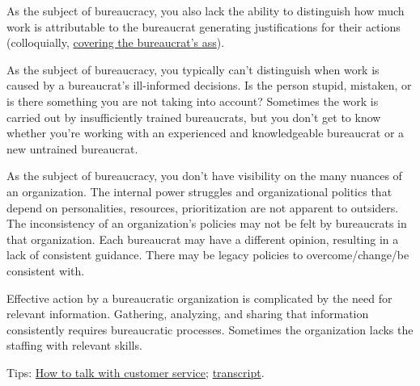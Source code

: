 As the subject of bureaucracy, you also lack the ability to distinguish how much work is attributable to the bureaucrat generating justifications for their actions (colloquially, \href{https://en.wikipedia.org/wiki/Cover_your_ass}{covering the bureaucrat's ass}). 

As the subject of bureaucracy, you typically can't distinguish when work is caused by a bureaucrat's ill-informed decisions. Is the person stupid, mistaken, or is there something you are not taking into account?
Sometimes the work is carried out by insufficiently trained bureaucrats, but you don't get to know whether you're working with an experienced and knowledgeable bureaucrat or a new untrained bureaucrat. 

As the subject of bureaucracy, you don't have visibility on the many nuances of an organization. The internal power struggles and organizational politics that depend on personalities, resources, prioritization are not apparent to outsiders.
The inconsistency of an organization's policies may not be felt by bureaucrats in that organization. Each bureaucrat may have a different opinion, resulting in a lack of consistent guidance.
There may be legacy policies to overcome/change/be consistent with.

Effective action by a bureaucratic organization is complicated by the need for relevant information. Gathering, analyzing, and sharing that information consistently requires bureaucratic processes. Sometimes the organization lacks the staffing with relevant skills. 


Tips: \href{https://www.npr.org/2022/03/16/1086915600/get-what-you-want-customer-service}{How to talk with customer service}; \href{https://www.npr.org/transcripts/1086915600}{transcript}.


